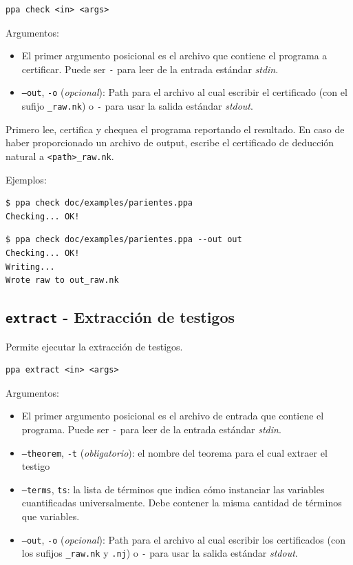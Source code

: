 \begin{verbatim}
ppa check <in> <args>
\end{verbatim}

Argumentos:

\begin{itemize}
    \item El primer argumento posicional es el archivo que contiene el programa
    a certificar. Puede ser \texttt{-} para leer de la entrada estándar \textit{stdin}.
    \item \texttt{--out}, \texttt{-o} (\textit{opcional}): Path para el archivo
    al cual escribir el certificado (con el sufijo \texttt{\_raw.nk}) o
    \texttt{-} para usar la salida estándar \textit{stdout}.
\end{itemize}


Primero lee, certifica y chequea el programa reportando el resultado. En caso de
haber proporcionado un archivo de output, escribe el certificado de deducción
natural a \texttt{<path>\_raw.nk}.

Ejemplos:

\begin{verbatim}
$ ppa check doc/examples/parientes.ppa
Checking... OK!
\end{verbatim}

\begin{verbatim}
$ ppa check doc/examples/parientes.ppa --out out   
Checking... OK!
Writing...
Wrote raw to out_raw.nk
\end{verbatim}

\subsection{\texttt{extract} - Extracción de testigos}

Permite ejecutar la extracción de testigos.

\begin{verbatim}
ppa extract <in> <args>
\end{verbatim}

Argumentos:

\begin{itemize}
    \item El primer argumento posicional es el archivo de entrada que contiene
    el programa. Puede ser \texttt{-} para leer de la entrada estándar \textit{stdin}.
    \item \texttt{--theorem}, \texttt{-t} (\textit{obligatorio}): el nombre del
    teorema para el cual extraer el testigo
    \item \texttt{--terms}, \texttt{ts}: la lista de términos que indica cómo
    instanciar las variables cuantificadas universalmente. Debe contener la
    misma cantidad de términos que variables.
    \item \texttt{--out}, \texttt{-o} (\textit{opcional}): Path para el archivo
    al cual escribir los certificados (con los sufijos \texttt{\_raw.nk} y
    \texttt{.nj}) o \texttt{-} para usar la salida estándar \textit{stdout}.
\end{itemize}

